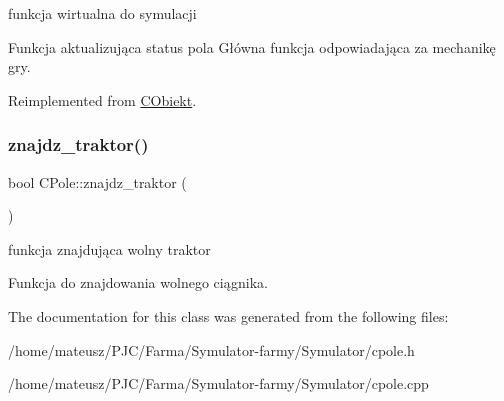 funkcja wirtualna do symulacji 

Funkcja aktualizująca status pola Główna funkcja odpowiadająca za mechanikę gry. 

Reimplemented from \mbox{\hyperlink{class_c_obiekt_adc05eb9790386eebbe24a31e434fd18f}{C\+Obiekt}}.

\mbox{\label{class_c_pole_a2272e326d39402016cf59132a5af78cf}} 
\subsubsection{\texorpdfstring{znajdz\+\_\+traktor()}{znajdz\_traktor()}}
{\footnotesize\ttfamily bool C\+Pole\+::znajdz\+\_\+traktor (\begin{DoxyParamCaption}{ }\end{DoxyParamCaption})}



funkcja znajdująca wolny traktor 

Funkcja do znajdowania wolnego ciągnika.

The documentation for this class was generated from the following files\+:\begin{DoxyCompactItemize}
\item 
/home/mateusz/\+P\+J\+C/\+Farma/\+Symulator-\/farmy/\+Symulator/cpole.\+h\item 
/home/mateusz/\+P\+J\+C/\+Farma/\+Symulator-\/farmy/\+Symulator/cpole.\+cpp\end{DoxyCompactItemize}
